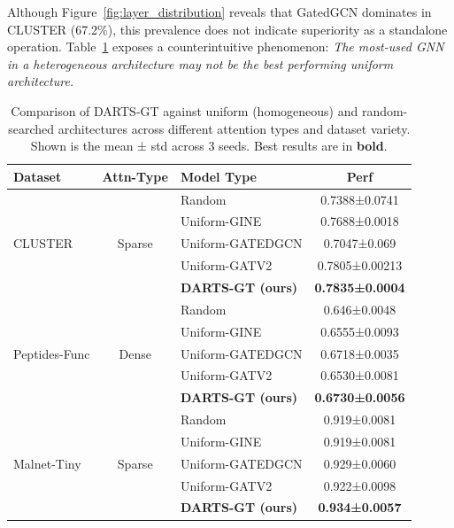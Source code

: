 \documentclass[lettersize,journal]{IEEEtran}
\begin{document}


Although Figure~\ref{fig:layer_distribution} reveals that GatedGCN dominates in CLUSTER (67.2\%), this prevalence does not indicate superiority as a standalone operation. Table~\ref{tab:darts_vs_uniform} exposes a counterintuitive phenomenon: \textit{The most-used GNN in a heterogeneous architecture may not be the best performing uniform architecture.}

\renewcommand{\arraystretch}{1.5}
\begin{table}[!t]
\centering
\caption{Comparison of DARTS-GT against uniform (homogeneous) and random-searched architectures across different attention types and dataset variety. Shown is the mean ± std across 3 seeds. Best results are in \textbf{bold}.}
\label{tab:darts_vs_uniform}
\setlength{\tabcolsep}{4pt} %
\begin{tabular}{l|c|l|c}
\toprule
\textbf{Dataset} & \textbf{Attn-Type} 
& \textbf{Model Type} & \textbf{Perf} \\
\midrule
\multirow{5}{*}{CLUSTER} & \multirow{5}{*}{Sparse} 
    & Random & 0.7388±0.0741 \\
    & & Uniform-GINE & 0.7688±0.0018 \\
    & & Uniform-GATEDGCN & 0.7047±0.069 \\
    & & Uniform-GATV2 & 0.7805±0.00213 \\
    & & \textbf{DARTS-GT (ours)} & \textbf{0.7835±0.0004} \\
\midrule
\multirow{5}{*}{Peptides-Func} & \multirow{5}{*}{Dense}
    & Random & 0.646±0.0048 \\
    & & Uniform-GINE & 0.6555±0.0093 \\
    & & Uniform-GATEDGCN & 0.6718±0.0035 \\
    & & Uniform-GATV2 & 0.6530±0.0081 \\
    & & \textbf{DARTS-GT (ours)} & \textbf{0.6730±0.0056} \\
\midrule
\multirow{5}{*}{Malnet-Tiny} & \multirow{5}{*}{Sparse}
    & Random & 0.919±0.0081 \\
    & & Uniform-GINE & 0.919±0.0081 \\
    & & Uniform-GATEDGCN & 0.929±0.0060 \\
    & & Uniform-GATV2 & 0.922±0.0098 \\
    & & \textbf{DARTS-GT (ours)} & \textbf{0.934±0.0057} \\
\bottomrule
\end{tabular}
\end{table}
\end{document}
